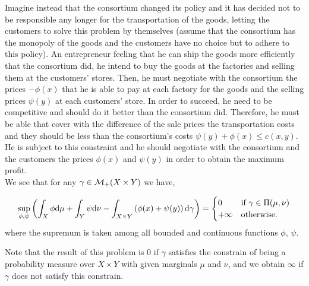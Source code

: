 Imagine instead that the consortium changed its policy and it has decided not to be responsible any longer for the transportation of the goods, letting the customers to solve this problem by themselves (assume that the consortium has the monopoly of the goods and the customers have no choice but to adhere to this policy). An entrepreneur feeling that he can ship the goods more efficiently that the consortium did, he intend to buy the goods at the factories and selling them at the customers' stores. Then, he must negotiate with the consortium the prices $-\phi(x)$ that he is able to pay at each factory for the goods and the selling prices $\psi(y)$ at each customers' store. In order to succeed, he need to be competitive and should do it better than the consortium did. Therefore, he must be able that cover with the difference of the sale prices the transportation costs and they should be less than the consortium's costs $\psi(y)+\phi(x)\leq c(x,y)$. He is subject to this constraint and he should negotiate with the consortium and the customers the prices $\phi(x)$ and $\psi(y)$ in order to obtain the maximum profit.
\\

We see that for any $\gamma \in \mathcal{M}_+(X\times Y)$ we have,

\begin{equation}
\sup_{\phi, \psi} \left( \int_X \phi\mathrm{d}\mu +\int_Y\psi\mathrm{d}\nu-\int_{X\times Y}\left( \phi(x)+\psi(y) \right)\mathrm{d} \gamma \right) = \begin{cases}
0 & \text{if } \gamma \in \Pi(\mu, \nu) \\
+\infty & \text{otherwise}.	
\end{cases}\label{eq: Constrain indicator}
\end{equation}
where the supremum is taken among all bounded and continuous functions $\phi$, $\psi$. 


Note that the result of this problem is $0$ if $\gamma$ satisfies the constrain of being a probability measure over $X\times Y$ with given marginals $\mu$ and $\nu$, and we obtain $\infty$ if $\gamma$ does not satisfy this constrain.

